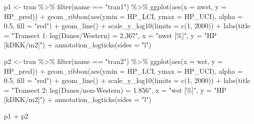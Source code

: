 \documentclass[
  12pt,
]{article}
\newenvironment{Shaded}{\begin{snugshade}}{\end{snugshade}}
\newcommand{\AttributeTok}[1]{\textcolor[rgb]{0.77,0.63,0.00}{#1}}
\newcommand{\DecValTok}[1]{\textcolor[rgb]{0.00,0.00,0.81}{#1}}
\newcommand{\FloatTok}[1]{\textcolor[rgb]{0.00,0.00,0.81}{#1}}
\newcommand{\FunctionTok}[1]{\textcolor[rgb]{0.00,0.00,0.00}{#1}}
\newcommand{\NormalTok}[1]{#1}
\newcommand{\OtherTok}[1]{\textcolor[rgb]{0.56,0.35,0.01}{#1}}
\newcommand{\SpecialCharTok}[1]{\textcolor[rgb]{0.00,0.00,0.00}{#1}}
\newcommand{\StringTok}[1]{\textcolor[rgb]{0.31,0.60,0.02}{#1}}
\begin{document}
\begin{Shaded}
\begin{Highlighting}[]
\NormalTok{p1 }\OtherTok{\textless{}{-}}\NormalTok{ tran }\SpecialCharTok{\%\textgreater{}\%} 
  \FunctionTok{filter}\NormalTok{(name }\SpecialCharTok{==} \StringTok{"tran1"}\NormalTok{) }\SpecialCharTok{\%\textgreater{}\%} 
  \FunctionTok{ggplot}\NormalTok{(}\FunctionTok{aes}\NormalTok{(}\AttributeTok{x =}\NormalTok{ nwst, }\AttributeTok{y =}\NormalTok{ HP\_pred)) }\SpecialCharTok{+} 
  \FunctionTok{geom\_ribbon}\NormalTok{(}\FunctionTok{aes}\NormalTok{(}\AttributeTok{ymin =}\NormalTok{ HP\_LCI,}
                  \AttributeTok{ymax =}\NormalTok{ HP\_UCI),}
              \AttributeTok{alpha =} \FloatTok{0.5}\NormalTok{,}
              \AttributeTok{fill =} \StringTok{"red"}\NormalTok{) }\SpecialCharTok{+}
  \FunctionTok{geom\_line}\NormalTok{() }\SpecialCharTok{+}
  \FunctionTok{scale\_y\_log10}\NormalTok{(}\AttributeTok{limits =} \FunctionTok{c}\NormalTok{(}\DecValTok{1}\NormalTok{, }\DecValTok{2000}\NormalTok{)) }\SpecialCharTok{+}
  \FunctionTok{labs}\NormalTok{(}\AttributeTok{title =} \StringTok{"Transect 1: log(Danes/Western) = 2.367"}\NormalTok{,}
       \AttributeTok{x =} \StringTok{"nwst [\%]"}\NormalTok{,}
       \AttributeTok{y =} \StringTok{"HP [kDKK/m2]"}\NormalTok{) }\SpecialCharTok{+}
  \FunctionTok{annotation\_logticks}\NormalTok{(}\AttributeTok{sides =} \StringTok{"l"}\NormalTok{)}

\NormalTok{p2 }\OtherTok{\textless{}{-}}\NormalTok{ tran }\SpecialCharTok{\%\textgreater{}\%} 
  \FunctionTok{filter}\NormalTok{(name }\SpecialCharTok{==} \StringTok{"tran2"}\NormalTok{) }\SpecialCharTok{\%\textgreater{}\%} 
  \FunctionTok{ggplot}\NormalTok{(}\FunctionTok{aes}\NormalTok{(}\AttributeTok{x =}\NormalTok{ wst, }\AttributeTok{y =}\NormalTok{ HP\_pred)) }\SpecialCharTok{+} 
  \FunctionTok{geom\_ribbon}\NormalTok{(}\FunctionTok{aes}\NormalTok{(}\AttributeTok{ymin =}\NormalTok{ HP\_LCI,}
                  \AttributeTok{ymax =}\NormalTok{ HP\_UCI),}
              \AttributeTok{alpha =} \FloatTok{0.5}\NormalTok{,}
              \AttributeTok{fill =} \StringTok{"red"}\NormalTok{) }\SpecialCharTok{+}
  \FunctionTok{geom\_line}\NormalTok{() }\SpecialCharTok{+}
  \FunctionTok{scale\_y\_log10}\NormalTok{(}\AttributeTok{limits =} \FunctionTok{c}\NormalTok{(}\DecValTok{1}\NormalTok{, }\DecValTok{2000}\NormalTok{)) }\SpecialCharTok{+}
  \FunctionTok{labs}\NormalTok{(}\AttributeTok{title =} \StringTok{"Transect 2: log(Danes/non{-}Western) = 1.856"}\NormalTok{,}
       \AttributeTok{x =} \StringTok{"wst [\%]"}\NormalTok{,}
       \AttributeTok{y =} \StringTok{"HP [kDKK/m2]"}\NormalTok{) }\SpecialCharTok{+} 
  \FunctionTok{annotation\_logticks}\NormalTok{(}\AttributeTok{sides =} \StringTok{"l"}\NormalTok{)}

\NormalTok{p1 }\SpecialCharTok{+}\NormalTok{ p2}
\end{Highlighting}
\end{Shaded}
\end{document}

